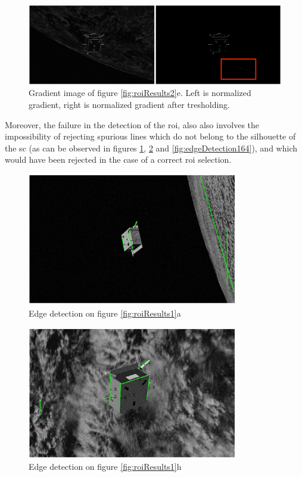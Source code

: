 \begin{figure}[htbp]
  \centering
  \includegraphics[width=1.0\textwidth]{gfx/results/prisma/164/8Select.png}
  \caption{Gradient image of figure \ref{fig:roiResults2}e. Left is normalized gradient, right is normalized gradient after tresholding.}
\end{figure}

Moreover, the failure in the detection of the \acrshort{roi}, also also involves
the impossibility of rejecting spurious lines which do not belong to the silhouette of the \acrshort{sc} (as can be observed in figures \ref{fig:edgeDetection101}, \ref{fig:edgeDetection117} and \ref{fig:edgeDetection164}), and which would have been rejected in the case of a correct \acrshort{roi} selection.

\begin{figure}[htbp]
  \centering
  \includegraphics[width=0.82\textwidth]{gfx/results/prisma/101/15.png}
  \caption{Edge detection on figure \ref{fig:roiResults1}a}
  \label{fig:edgeDetection101}
\end{figure}

\begin{figure}[htbp]
  \centering
  \includegraphics[width=0.82\textwidth]{gfx/results/prisma/117/15.png}
  \caption{Edge detection on figure \ref{fig:roiResults1}h}
  \label{fig:edgeDetection117}
\end{figure}

